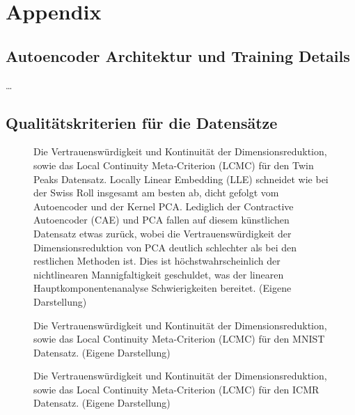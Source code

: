 
\chapter{Appendix}
\label{ch:Appendix}

\section{Autoencoder Architektur und Training Details}
\label{ch:Appendix:Architektur-Details}

\dots

\section{Qualitätskriterien für die Datensätze}
\label{ch:Appendix:Qualitaetskriterien}
\begin{figure}[ht]
	\begin{center}
		
	\end{center}
	\caption[Twin Peaks Qualitätskriterien]{Die Vertrauenswürdigkeit und Kontinuität der Dimensionsreduktion, sowie das Local Continuity Meta-Criterion (LCMC) für den Twin Peaks Datensatz. Locally Linear Embedding (LLE) schneidet wie bei der Swiss Roll insgesamt am besten ab, dicht gefolgt vom Autoencoder und der Kernel PCA. Lediglich der Contractive Autoencoder (CAE) und PCA fallen auf diesem künstlichen Datensatz etwas zurück, wobei die Vertrauenswürdigkeit der Dimensionsreduktion von PCA deutlich schlechter als bei den restlichen Methoden ist. Dies ist höchstwahrscheinlich der nichtlinearen Mannigfaltigkeit geschuldet, was der linearen Hauptkomponentenanalyse Schwierigkeiten bereitet. (Eigene Darstellung)}
	\label{fig:TwinPeaksMetrics}
\end{figure}
\begin{figure}[ht]
	\begin{center}
		
	\end{center}
	\caption[MNIST Qualitätskriterien]{Die Vertrauenswürdigkeit und Kontinuität der Dimensionsreduktion, sowie das Local Continuity Meta-Criterion (LCMC) für den MNIST Datensatz. (Eigene Darstellung)}
	\label{fig:MNISTMetrics}
\end{figure}

\begin{figure}[ht]
	\begin{center}
		
	\end{center}
	\caption[ICMR Qualitätskriterien]{Die Vertrauenswürdigkeit und Kontinuität der Dimensionsreduktion, sowie das Local Continuity Meta-Criterion (LCMC) für den ICMR Datensatz. (Eigene Darstellung)}
	\label{fig:ICMRMetrics}
\end{figure}

